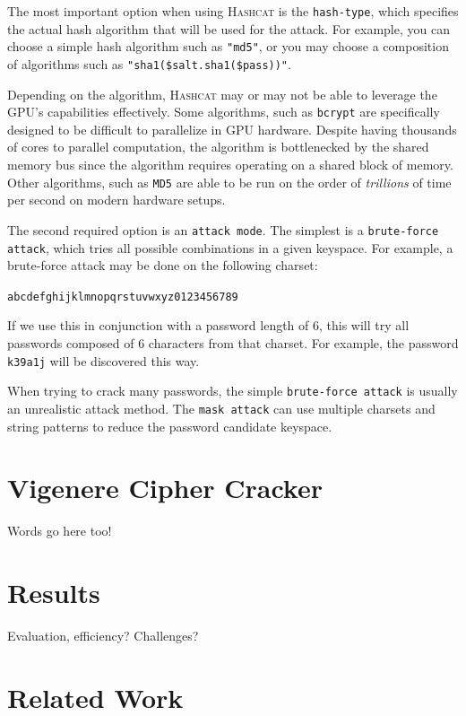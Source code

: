 \documentclass[acmlarge]{acmart}
\begin{document}
The most important option when using \textsc{Hashcat} is the \texttt{hash-type}, which specifies the actual hash algorithm that will be used for the attack. For example, you can choose a simple hash algorithm such as \texttt{"md5"}, or you may choose a composition of algorithms such as \texttt{"sha1(\$salt.sha1(\$pass))"}.

Depending on the algorithm, \textsc{Hashcat} may or may not be able to leverage the GPU's capabilities effectively. Some algorithms, such as \texttt{bcrypt} are specifically designed to be difficult to parallelize in GPU hardware. Despite having thousands of cores to parallel computation, the algorithm is bottlenecked by the shared memory bus since the algorithm requires operating on a shared block of memory. Other algorithms, such as \texttt{MD5} are able to be run on the order of \textit{trillions} of time per second on modern hardware setups.

The second required option is an \texttt{attack mode}. The simplest is a \texttt{brute-force attack}, which tries all possible combinations in a given keyspace. For example, a brute-force attack may be done on the following charset:

\begin{center}
\texttt{abcdefghijklmnopqrstuvwxyz0123456789}	
\end{center}

If we use this in conjunction with a password length of $6$, this will try all passwords composed of $6$ characters from that charset. For example, the password \texttt{k39a1j} will be discovered this way.

When trying to crack many passwords, the simple \texttt{brute-force attack} is usually an unrealistic attack method. The \texttt{mask attack} can use multiple charsets and string patterns to reduce the password candidate keyspace. 

\section{Vigenere Cipher Cracker}\label{sec:vinegar}

Words go here too!

\section{Results}\label{sec:results}

Evaluation, efficiency? Challenges?

\section{Related Work}\label{sec:relatedwork}
\end{document}
